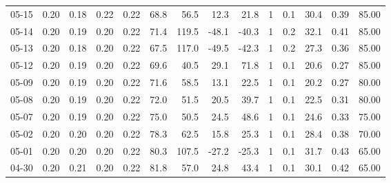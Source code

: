 \begin{threeparttable}
{\begin{tabular}{lrrrrrrrrrrrrr}
  05-15 &          0.20 &          0.18 &          0.22 &        0.22 &                68.8 &                56.5 &       12.3 &         21.8 &              1 &                 0.1 &             30.4 &            0.39 &                  85.00 \\
  05-14 &          0.20 &          0.19 &          0.20 &        0.22 &                71.4 &               119.5 &      -48.1 &        -40.3 &              1 &                 0.2 &             32.1 &            0.41 &                  85.00 \\
  05-13 &          0.20 &          0.18 &          0.20 &        0.22 &                67.5 &               117.0 &      -49.5 &        -42.3 &              1 &                 0.2 &             27.3 &            0.36 &                  85.00 \\
  05-12 &          0.20 &          0.19 &          0.20 &        0.22 &                69.6 &                40.5 &       29.1 &         71.8 &              1 &                 0.1 &             20.6 &            0.27 &                  85.00 \\
  05-09 &          0.20 &          0.19 &          0.20 &        0.22 &                71.6 &                58.5 &       13.1 &         22.5 &              1 &                 0.1 &             20.2 &            0.27 &                  80.00 \\
  05-08 &          0.20 &          0.19 &          0.20 &        0.22 &                72.0 &                51.5 &       20.5 &         39.7 &              1 &                 0.1 &             22.5 &            0.31 &                  80.00 \\
  05-07 &          0.20 &          0.19 &          0.20 &        0.22 &                75.0 &                50.5 &       24.5 &         48.6 &              1 &                 0.1 &             24.6 &            0.33 &                  75.00 \\
  05-02 &          0.20 &          0.20 &          0.20 &        0.22 &                78.3 &                62.5 &       15.8 &         25.3 &              1 &                 0.1 &             28.4 &            0.38 &                  70.00 \\
  05-01 &          0.20 &          0.20 &          0.20 &        0.22 &                80.3 &               107.5 &      -27.2 &        -25.3 &              1 &                 0.1 &             31.7 &            0.43 &                  65.00 \\
  04-30 &          0.20 &          0.21 &          0.20 &        0.22 &                81.8 &                57.0 &       24.8 &         43.4 &              1 &                 0.1 &             30.1 &            0.42 &                  65.00 \\

\end{tabular}}
\end{threeparttable}
